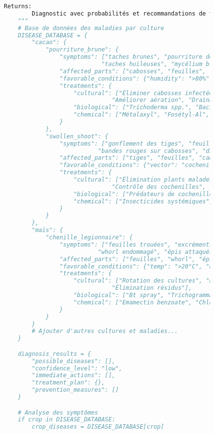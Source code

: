 \begin{figure}[h]
\begin{lstlisting}[language=Python, caption=Implémentation d'outils spécialisés pour l'agriculture]
    Returns:
        Diagnostic avec probabilités et recommandations de traitement
    """
    # Base de données des maladies par culture
    DISEASE_DATABASE = {
        "cacao": {
            "pourriture_brune": {
                "symptoms": ["taches brunes", "pourriture des cabosses",
                            "taches huileuses", "mycélium blanc"],
                "affected_parts": ["cabosses", "feuilles", "tronc"],
                "favorable_conditions": {"humidity": ">80%", "temp": "20-30°C"},
                "treatments": {
                    "cultural": ["Éliminer cabosses infectées",
                               "Améliorer aération", "Drainage"],
                    "biological": ["Trichoderma spp.", "Bacillus subtilis"],
                    "chemical": ["Métalaxyl", "Fosétyl-Al", "Hydroxyde de cuivre"]
                }
            },
            "swollen_shoot": {
                "symptoms": ["gonflement des tiges", "feuilles déformées",
                           "bandes rouges sur cabosses", "die-back"],
                "affected_parts": ["tiges", "feuilles", "cabosses"],
                "favorable_conditions": {"vector": "cochenilles"},
                "treatments": {
                    "cultural": ["Élimination plants malades",
                               "Contrôle des cochenilles", "Replantation"],
                    "biological": ["Prédateurs de cochenilles"],
                    "chemical": ["Insecticides systémiques"]
                }
            }
        },
        "maïs": {
            "chenille_legionnaire": {
                "symptoms": ["feuilles trouées", "excréments visibles",
                           "whorl endommagé", "épis attaqués"],
                "affected_parts": ["feuilles", "whorl", "épis"],
                "favorable_conditions": {"temp": ">20°C", "humidity": "moderate"},
                "treatments": {
                    "cultural": ["Rotation des cultures", "Labour profond",
                               "Élimination résidus"],
                    "biological": ["Bt spray", "Trichogramma", "Neem"],
                    "chemical": ["Emamectin benzoate", "Chlorantraniliprole"]
                }
            }
        }
        # Ajouter d'autres cultures et maladies...
    }

    diagnosis_results = {
        "possible_diseases": [],
        "confidence_level": "low",
        "immediate_actions": [],
        "treatment_plan": {},
        "prevention_measures": []
    }

    # Analyse des symptômes
    if crop in DISEASE_DATABASE:
        crop_diseases = DISEASE_DATABASE[crop]


\end{lstlisting}
\end{figure}
